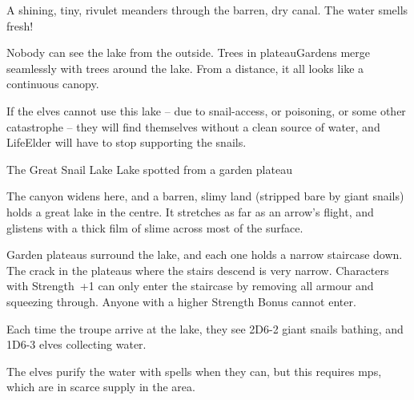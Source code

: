 \begin{multicols}{2}
\begin{boxtext}
  A shining, tiny, rivulet meanders through the barren, dry canal.
  The water smells fresh!
\end{boxtext}

Nobody can see the lake from the outside.
Trees in \gls{plateauGardens} merge seamlessly with trees around the lake.
From a distance, it all looks like a continuous canopy.

If the elves cannot use this lake -- due to snail-access, or poisoning, or some other catastrophe -- they will find themselves without a clean source of water, and \gls{LifeElder} will have to stop supporting the snails.

{The Great Snail Lake}%
{Lake spotted from a garden plateau}%

The canyon widens here, and a barren, slimy land (stripped bare by giant snails) holds a great lake in the centre.
It stretches as far as an arrow's flight, and glistens with a thick film of slime across most of the surface.

Garden plateaus surround the lake, and each one holds a narrow staircase down.
The crack in the plateaus where the stairs descend is very narrow.
Characters with Strength~+1 can only enter the staircase by removing all armour and squeezing through.
Anyone with a higher Strength Bonus cannot enter.

Each time the troupe arrive at the lake,
they see 2D6-2 giant snails bathing, and 1D6-3 elves collecting water.

The elves purify the water with spells when they can, but this requires \glspl{mp}, which are in scarce supply in the area.

\end{multicols}
